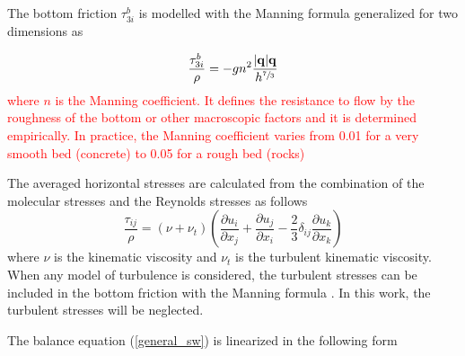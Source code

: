 \documentclass[a4paper,12pt]{elsarticle}
\newcommand{\Miguel}[1]{\textcolor{red}{#1}}
\newcommand{\pder}[2]{\frac{\partial#1}{\partial#2}}
\newcommand{\abs}[1]{\lvert#1\rvert}
\begin{document}
The bottom friction $\tau^b_{3i}$ is modelled with the Manning formula generalized for two dimensions as

\begin{equation}
\frac{\tau^b_{3i}}{\rho} = -gn^2\frac{\abs{\mathbf{q}}\mathbf{q}}{h^{\sfrac{7}{3}}}
\end{equation}
\Miguel{
where $n$ is the Manning coefficient. It defines the resistance to flow by the roughness of the bottom or other macroscopic factors and it is determined empirically. In practice, the Manning coefficient varies from 0.01 for a very smooth bed (concrete) to 0.05 for a rough bed (rocks) \cite{chow1988}
}

The averaged horizontal stresses are calculated from the combination of the molecular stresses and the Reynolds stresses as follows
\begin{equation} \label{stresses}
\frac{\tau_{ij}}{\rho} = (\nu + \nu_t)\left(
    \pder{u_i}{x_j} + \pder{u_j}{x_i} -\frac{2}{3}\delta_{ij}\pder{u_k}{x_k} \right)
\end{equation}
where $\nu$ is the kinematic viscosity and $\nu_t$ is the turbulent kinematic viscosity. When any model of turbulence is considered, the turbulent stresses can be included in the bottom friction with the Manning formula \cite{blade2005}. In this work, the turbulent stresses will be neglected.

The balance equation (\ref{general_sw}) is linearized in the following form
\end{document}
